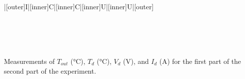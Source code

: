 \begin{paper}
{\begin{papertable}{|[outer]I|[inner]C|[inner]C|[inner]U|[inner]U|[outer]}
\papertableindex{}\\\paperiline
\papertableindex{}\\\paperiline
\papertableindex{}\\\paperiline
\papertableindex{}\\\paperiline
\papertableindex{}\\\paperoline
\end{papertable}\vspace{-0.5em}}{Measurements of $T_{out}$ ($\si{\celsius}$), $T_d$ ($\si{\celsius}$), $V_d$ ($\si{\volt}$), and $I_d$ ($\si{\ampere}$) for the first part of the second part of the experiment.}


\end{paper}
